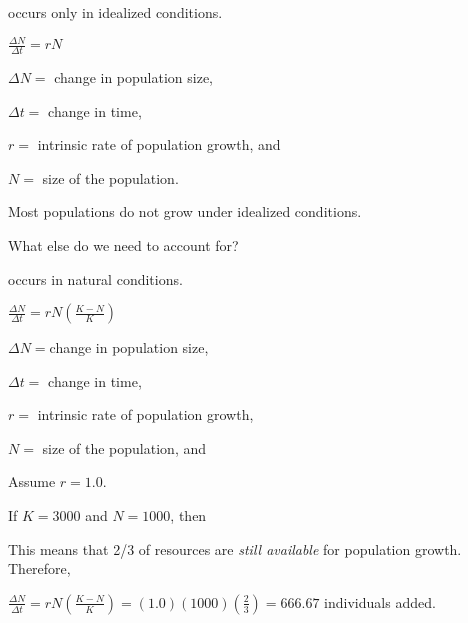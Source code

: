 \documentclass[t]{beamer}
\begin{document}
%
\begin{frame}{ occurs only in idealized conditions.}
	\begin{center}
		\Huge $\frac{\Delta N}{\Delta t} = rN$
	\end{center}
	
	\hangpara $\Delta N = $ change in population size,

	\hangpara $\Delta t = $ change in time,
	
	\hangpara $r = $ intrinsic rate of population growth, and
	
	\hangpara $N = $ size of the population.
	
\end{frame}
%
{
\begin{frame}[b]
\end{frame}
}
%
{
\begin{frame}[b]
\end{frame}
}
%
\begin{frame}{}

	\hangpara\Large Most populations do not grow under idealized conditions.
	
	\hangpara\Large What else do we need to account for?
	
	\pause
	\hangpara {}
	
\end{frame}
%
\begin{frame}{ occurs in natural conditions.}
	\begin{center}
		\Huge $\frac{\Delta N}{\Delta t} = rN\left(\frac{K-N}{K}\right)$
	\end{center}
	
	\hangpara $\Delta N = $change in population size,

	\hangpara $\Delta t = $ change in time,
	
	\hangpara $r = $ intrinsic rate of population growth, 
	
	\hangpara $N = $ size of the population, and
	
	\hangpara {}
	
\end{frame}
%
\begin{frame}
	\hangpara Assume $r = 1.0$.
	
	\hangpara If $K = 3000$ and $N = 1000$, \pause then
	
	
	\hangpara This means that 2/3 of resources are \emph{still available} for population growth. \pause Therefore,
	
	\hangpara $\frac{\Delta N}{\Delta t} = rN\left(\frac{K-N}{K}\right) = (1.0)(1000)(\frac{2}{3}) = 666.67$ individuals added.
\end{frame}
\end{document}
